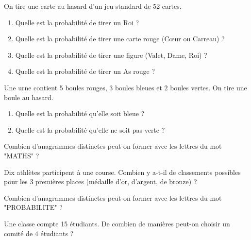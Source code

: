 \begin{exercicebox}
On tire une carte au hasard d'un jeu standard de 52 cartes.
\begin{enumerate}
    \item Quelle est la probabilité de tirer un Roi ?
    \item Quelle est la probabilité de tirer une carte rouge (Cœur ou Carreau) ?
    \item Quelle est la probabilité de tirer une figure (Valet, Dame, Roi) ?
    \item Quelle est la probabilité de tirer un As rouge ?
\end{enumerate}
\end{exercicebox}

\begin{exercicebox}
Une urne contient 5 boules rouges, 3 boules bleues et 2 boules vertes. On tire une boule au hasard.
\begin{enumerate}
    \item Quelle est la probabilité qu'elle soit bleue ?
    \item Quelle est la probabilité qu'elle ne soit pas verte ?
\end{enumerate}
\end{exercicebox}


\begin{exercicebox}
Combien d'anagrammes distinctes peut-on former avec les lettres du mot "MATHS" ?
\end{exercicebox}

\begin{exercicebox}
Dix athlètes participent à une course. Combien y a-t-il de classements possibles pour les 3 premières places (médaille d'or, d'argent, de bronze) ?
\end{exercicebox}

\begin{exercicebox}
Combien d'anagrammes distinctes peut-on former avec les lettres du mot "PROBABILITE" ?
\end{exercicebox}


\begin{exercicebox}
Une classe compte 15 étudiants. De combien de manières peut-on choisir un comité de 4 étudiants ?
\end{exercicebox}

